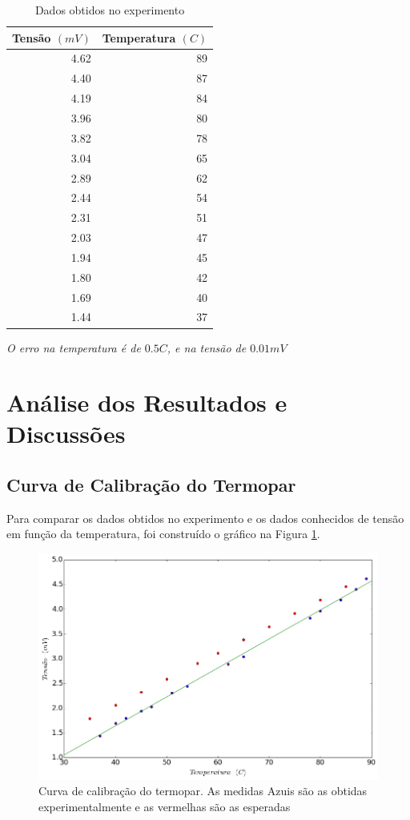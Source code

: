 \documentclass[12pt,a4paper]{article}
\begin{document}
\begin{table}[!htbp]

\centering
\def\arraystretch{1.5}
\caption{Dados obtidos no experimento}

\begin{tabular}{|r|r|}
\hline
Tensão $(mV)$ & Temperatura $(C)$\\
\hline
 4.62 & 89 \\
 \hline
 4.40  & 87 \\
 \hline
 4.19 & 84 \\
 \hline
 3.96 & 80 \\
 \hline
 3.82 & 78 \\
 \hline
 3.04 & 65 \\
 \hline
 2.89 & 62 \\
 \hline
 2.44 & 54 \\
 \hline
 2.31 & 51 \\
 \hline
 2.03 & 47 \\
 \hline
 1.94 & 45 \\
 \hline
 1.80  & 42 \\
 \hline
 1.69 & 40 \\
 \hline
 1.44 & 37 \\
\hline
\end{tabular}

\emph{O erro na temperatura é de $0.5 C$, e na tensão de $0.01 mV$}
\label{dados}
\end{table}


\section{Análise dos Resultados e Discussões}

\subsection{Curva de Calibração do Termopar}
Para comparar os dados obtidos no experimento e os dados conhecidos de tensão em função da temperatura, foi construído o gráfico na Figura \ref{termopar}.

\begin{figure}[!htbp]
\includegraphics[scale=0.55]{termopar.png}
\caption{Curva de calibração do termopar. As medidas Azuis são as obtidas experimentalmente e as vermelhas são as esperadas}
\label{termopar}
\end{figure}
\end{document}
